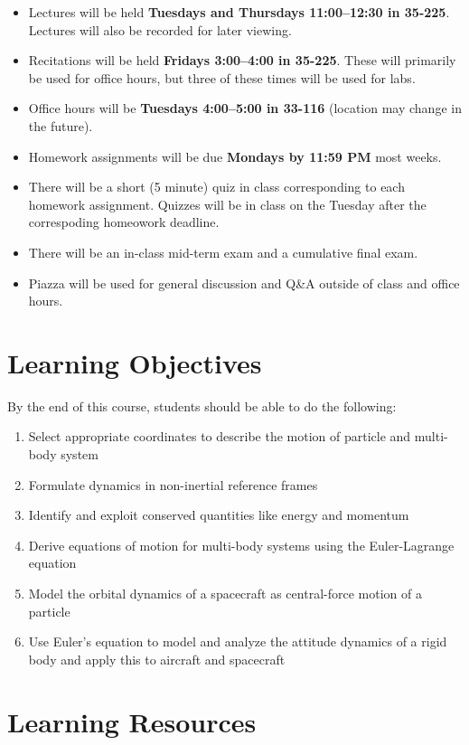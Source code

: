 \documentclass[11pt,letterpaper]{article}
\begin{document}
\begin{itemize}
	\item Lectures will be held \textbf{Tuesdays and Thursdays 11:00--12:30 in 35-225}. Lectures will also be recorded for later viewing.
	\item Recitations will be held \textbf{Fridays 3:00--4:00 in 35-225}. These will primarily be used for office hours, but three of these times will be used for labs.
	\item Office hours will be \textbf{Tuesdays 4:00--5:00 in 33-116} (location may change in the future).
	\item Homework assignments will be due \textbf{Mondays by 11:59 PM} most weeks.
	\item There will be a short (5 minute) quiz in class corresponding to each homework assignment. Quizzes will be in class on the Tuesday after the correspoding homeowork deadline.
	\item There will be an in-class mid-term exam and a cumulative final exam.
	\item Piazza will be used for general discussion and Q\&A outside of class and office hours.
\end{itemize}

\newpage 
\section*{Learning Objectives}
By the end of this course, students should be able to do the following:
\begin{enumerate}
	\item Select appropriate coordinates to describe the motion of particle and multi-body system
	\item Formulate dynamics in non-inertial reference frames
	\item Identify and exploit conserved quantities like energy and momentum
	\item Derive equations of motion for multi-body systems using the Euler-Lagrange equation
	\item Model the orbital dynamics of a spacecraft as central-force motion of a particle
	\item Use Euler's equation to model and analyze the attitude dynamics of a rigid body and apply this to aircraft and spacecraft
\end{enumerate}

\section*{Learning Resources}
\end{document}
